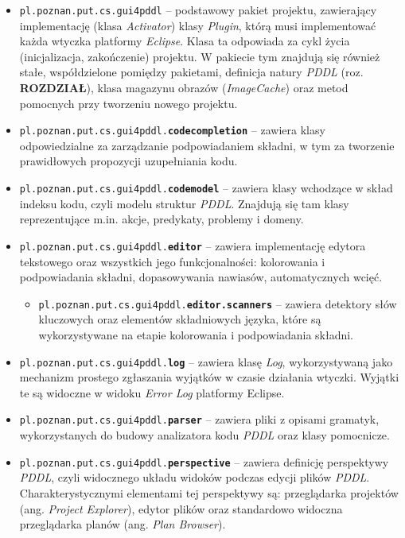 \begin{itemize}
\item \texttt{pl.poznan.put.cs.gui4pddl} -- podstawowy pakiet projektu, zawierający implementację (klasa \textit{Activator}) klasy \textit{Plugin}, którą musi implementować każda wtyczka platformy \textit{Eclipse}. Klasa ta odpowiada za cykl życia (inicjalizacja, zakończenie) projektu. W pakiecie tym znajdują się również stałe, współdzielone pomiędzy pakietami, definicja natury \textit{PDDL} (roz. \textbf{ROZDZIAŁ}), klasa magazynu obrazów (\textit{ImageCache}) oraz metod pomocnych przy tworzeniu nowego projektu.
\item \texttt{pl.poznan.put.cs.gui4pddl.\textbf{codecompletion}} -- zawiera klasy odpowiedzialne za zarządzanie podpowiadaniem składni, w tym za tworzenie prawidłowych propozycji uzupełniania kodu.
\item \texttt{pl.poznan.put.cs.gui4pddl.\textbf{codemodel}} -- zawiera klasy wchodzące w skład indeksu kodu, czyli modelu struktur \textit{PDDL}. Znajdują się tam klasy reprezentujące m.in. akcje, predykaty, problemy i domeny.
\item \texttt{pl.poznan.put.cs.gui4pddl.\textbf{editor}} -- zawiera implementację edytora tekstowego oraz wszystkich jego funkcjonalności: kolorowania i podpowiadania składni, dopasowywania nawiasów, automatycznych wcięć.
\begin{itemize}
\item \texttt{pl.poznan.put.cs.gui4pddl.\textbf{editor.scanners}} -- zawiera detektory słów kluczowych oraz elementów składniowych języka, które są wykorzystywane na etapie kolorowania i podpowiadania składni.
\end{itemize}
\item \texttt{pl.poznan.put.cs.gui4pddl.\textbf{log}} -- zawiera klasę \textit{Log}, wykorzystywaną jako mechanizm prostego zgłaszania wyjątków w czasie działania wtyczki. Wyjątki te są widoczne w widoku \textit{Error Log} platformy Eclipse.
\item \texttt{pl.poznan.put.cs.gui4pddl.\textbf{parser}} -- zawiera pliki z opisami gramatyk, wykorzystanych do budowy analizatora kodu \textit{PDDL} oraz klasy pomocnicze.
\item \texttt{pl.poznan.put.cs.gui4pddl.\textbf{perspective}} -- zawiera definicję perspektywy \textit{PDDL}, czyli widocznego układu widoków podczas edycji plików \textit{PDDL}. Charakterystycznymi elementami tej perspektywy są: przeglądarka projektów (ang. \textit{Project Explorer}), edytor plików oraz standardowo widoczna przeglądarka planów (ang. \textit{Plan Browser}).

\end{itemize}
